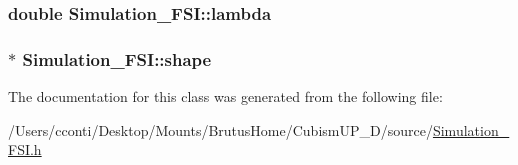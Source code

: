 \subsubsection[{lambda}]{\setlength{\rightskip}{0pt plus 5cm}double Simulation\+\_\+\+F\+S\+I\+::lambda\hspace{0.3cm}{\ttfamily [protected]}}\label{class_simulation___f_s_i_a3546333c7042859fc9b1706604cd744d}
\hypertarget{class_simulation___f_s_i_a57f9bd36f7f37bf62dc4bed30c7f2111}{}
\subsubsection[{shape}]{$\ast$ Simulation\+\_\+\+F\+S\+I\+::shape\hspace{0.3cm}{\ttfamily [protected]}}\label{class_simulation___f_s_i_a57f9bd36f7f37bf62dc4bed30c7f2111}


The documentation for this class was generated from the following file\+:\begin{DoxyCompactItemize}
\item 
/\+Users/cconti/\+Desktop/\+Mounts/\+Brutus\+Home/\+Cubism\+U\+P\+\_\+D/source/\hyperlink{_simulation___f_s_i_8h}{Simulation\+\_\+\+F\+S\+I.\+h}\end{DoxyCompactItemize}
